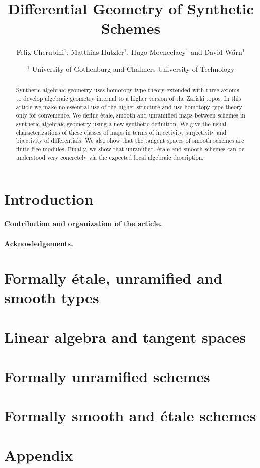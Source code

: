 \documentclass{../util/zariski}
\title{Differential Geometry of Synthetic Schemes}
\author{Felix Cherubini$^1$, Matthias Hutzler$^1$, Hugo Moeneclaey$^1$ and David Wärn$^1$}
\date{$^1$ University of Gothenburg and Chalmers University of Technology }
\begin{document}
\maketitle

\begin{abstract}
  Synthetic algebraic geometry uses homotopy type theory extended with three axioms to develop algebraic geometry internal to a higher version of the Zariski topos.
  In this article we make no essential use of the higher structure and use homotopy type theory only for convenience.
  We define étale, smooth and unramified maps between schemes in synthetic algebraic geometry using a new synthetic definition.
  We give the usual characterizations of these classes of maps in terms of injectivity, surjectivity and bijectivity of differentials. We also show that the tangent spaces of smooth schemes are finite free modules.
  Finally, we show that unramified, étale and smooth schemes can be understood very concretely via the expected local algebraic description.
\end{abstract}

\tableofcontents

\section*{Introduction}

\paragraph{Contribution and organization of the article. }

\paragraph{Acknowledgements. }


\section{Formally étale, unramified and smooth types}


\section{Linear algebra and tangent spaces}


\section{Formally unramified schemes}


\section{Formally smooth and étale schemes}


\pagebreak
\appendix
\section{Appendix}


\printindex

\printbibliography
\end{document}
